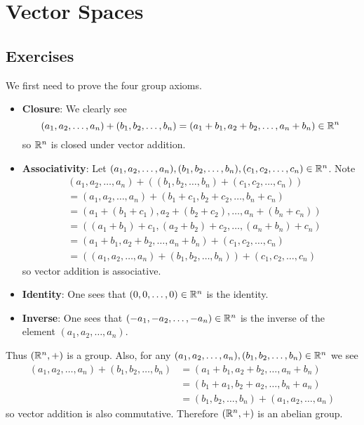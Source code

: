 \section{Vector Spaces}
\subsection*{Exercises}
\begin{questions}
    \item We first need to prove the four group axioms.
    \begin{itemize}
        \item \textbf{Closure}: We clearly see
        \[
            (a_1, a_2, \dots, a_n) + (b_1, b_2, \dots, b_n) = (a_1 + b_1, a_2 + b_2, \dots, a_n + b_n) \in \mathbb{R}^n
        \]
        so $\mathbb{R}^n$ is closed under vector addition.

        \item \textbf{Associativity}: Let $(a_1, a_2, \dots, a_n), (b_1, b_2, \dots, b_n), (c_1, c_2, \dots, c_n) \in \mathbb{R}^n$. Note
        \begin{align*}
            &(a_1, a_2, \dots, a_n) + \left((b_1, b_2, \dots, b_n) + (c_1, c_2, \dots, c_n)\right)\\
            &= (a_1, a_2, \dots, a_n) + (b_1 + c_1, b_2 + c_2, \dots, b_n + c_n)\\
            &= (a_1 + (b_1 + c_1), a_2 + (b_2 + c_2), \dots, a_n + (b_n + c_n))\\
            &= ((a_1 + b_1) + c_1, (a_2 + b_2) + c_2, \dots, (a_n + b_n) + c_n)\\
            &= (a_1 + b_1, a_2 + b_2, \dots, a_n + b_n) + (c_1, c_2, \dots, c_n)\\
            &= \left((a_1, a_2, \dots, a_n) + (b_1, b_2, \dots, b_n)\right) + (c_1, c_2, \dots, c_n)
        \end{align*}
        so vector addition is associative.

        \item \textbf{Identity}: One sees that $(0, 0, \dots, 0) \in \mathbb{R}^n$ is the identity.

        \item \textbf{Inverse}: One sees that $(-a_1, -a_2, \dots, -a_n) \in \mathbb{R}^n$ is the inverse of the element $(a_1, a_2, \dots, a_n)$.
    \end{itemize}

    Thus $(\mathbb{R}^n, +)$ is a group. Also, for any $(a_1, a_2, \dots, a_n), (b_1, b_2, \dots, b_n) \in \mathbb{R}^n$ we see
    \begin{align*}
        (a_1, a_2, \dots, a_n) + (b_1, b_2, \dots, b_n) &= (a_1 + b_1, a_2 + b_2, \dots, a_n + b_n)\\
        &= (b_1+a_1, b_2+a_2, \dots, b_n+a_n)\\
        &= (b_1, b_2, \dots, b_n) + (a_1, a_2, \dots, a_n)
    \end{align*}
    so vector addition is also commutative. Therefore $(\mathbb{R}^n, +)$ is an abelian group.


\end{questions}
